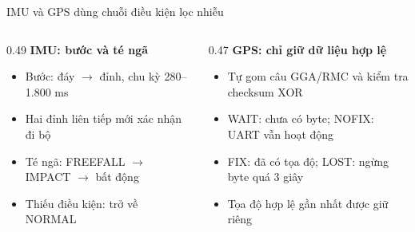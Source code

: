 \documentclass[aspectratio=169,11pt]{beamer}
\begin{document}
\begin{frame}{IMU và GPS dùng chuỗi điều kiện lọc nhiễu}
  \begin{columns}[T,onlytextwidth]
    \begin{column}{0.49\textwidth}
      {\large\bfseries IMU: bước và té ngã}\par\vspace{2mm}
      \small
      \begin{itemize}\setlength\itemsep{2mm}
        \item Bước: đáy $\rightarrow$ đỉnh, chu kỳ 280--1.800 ms
        \item Hai đỉnh liên tiếp mới xác nhận đi bộ
        \item Té ngã: FREEFALL $\rightarrow$ IMPACT $\rightarrow$ bất động
        \item Thiếu điều kiện: trở về NORMAL
      \end{itemize}
    \end{column}
    \begin{column}{0.47\textwidth}
      {\large\bfseries GPS: chỉ giữ dữ liệu hợp lệ}\par\vspace{2mm}
      \small
      \begin{itemize}\setlength\itemsep{2mm}
        \item Tự gom câu GGA/RMC và kiểm tra checksum XOR
        \item WAIT: chưa có byte; NOFIX: UART vẫn hoạt động
        \item FIX: đã có tọa độ; LOST: ngừng byte quá 3 giây
        \item Tọa độ hợp lệ gần nhất được giữ riêng
      \end{itemize}
    \end{column}
  \end{columns}
\end{frame}
\end{document}
